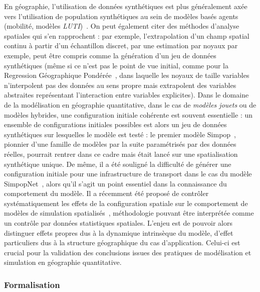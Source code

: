 En géographie, l'utilisation de données synthétiques est plus généralement axée vers l'utilisation de population synthétiques au sein de modèles basés agents (mobilité, modèles \emph{LUTI})~\cite{pritchard2009advances}. On peut également citer des méthodes d'analyse spatiales qui s'en rapprochent : par exemple, l'extrapolation d'un champ spatial continu à partir d'un échantillon discret, par une estimation par noyaux par exemple, peut être compris comme la génération d'un jeu de données synthétiques (même si ce n'est pas le point de vue initial, comme pour la Regression Géographique Pondérée~\cite{brunsdon1998geographically}, dans laquelle les noyaux de taille variables n'interpolent pas des données au sens propre mais extrapolent des variables abstraites représentant l'interaction entre variables explicites). Dans le domaine de la modélisation en géographie quantitative, dans le cas de \emph{modèles jouets} ou de modèles hybrides, une configuration initiale cohérente est souvent essentielle : un ensemble de configurations initiales possibles est alors un jeu de données synthétiques sur lesquelles le modèle est testé : le premier modèle Simpop~\cite{sanders1997simpop}, pionnier d'une famille de modèles par la suite paramétrisés par des données réelles, pourrait rentrer dans ce cadre mais était lancé sur une spatialisation synthétique unique. De même, il a été souligné la difficulté de générer une configuration initiale pour une infrastructure de transport dans le cas du modèle SimpopNet~\cite{schmitt2014modelisation}, alors qu'il s'agit un point essentiel dans la connaissance du comportement du modèle. Il a récemment été proposé de contrôler systématiquement les effets de la configuration spatiale sur le comportement de modèles de simulation spatialisés~\cite{cottineau2015revisiting}, méthodologie pouvant être interprétée comme un contrôle par données statistiques spatiales. L'enjeu est de pouvoir alors distinguer effets propres dus à la dynamique intrinsèque du modèle, d'effet particuliers dus à la structure géographique du cas d'application. Celui-ci est crucial pour la validation des conclusions issues des pratiques de modélisation et simulation en géographie quantitative.


\subsubsection{Formalisation}

